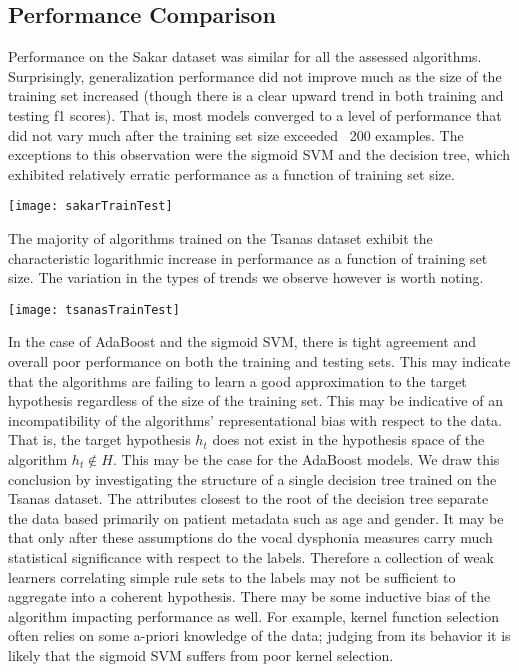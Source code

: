 \documentclass[12pt]{article}
\begin{document}
\begin{figure}%
    \centering
    \qquad
    \label{fig:svm}%
\end{figure}

\subsection{Performance Comparison}
Performance on the Sakar dataset was similar for all the assessed algorithms. Surprisingly, generalization performance did not improve much as the size of the training set increased (though there is a clear upward trend in both training and testing f1 scores). That is, most models converged to a level of performance that did not vary much after the training set size exceeded ~200 examples. The exceptions to this observation were the sigmoid SVM and the decision tree, which exhibited relatively erratic performance as a function of training set size.
\begin{center}
\texttt{[image: sakarTrainTest]}
\end{center}
The majority of algorithms trained on the Tsanas dataset exhibit the characteristic logarithmic increase in performance as a function of training set size. The variation in the types of trends we observe however is worth noting.
\begin{center}
\texttt{[image: tsanasTrainTest]}
\end{center}
In the case of AdaBoost and the sigmoid SVM, there is tight agreement and overall poor performance on both the training and testing sets. This may indicate that the algorithms are failing to learn a good approximation to the target hypothesis regardless of the size of the training set. This may be indicative of an incompatibility of the algorithms' representational bias with respect to the data. That is, the target hypothesis $h_t$ does not exist in the hypothesis space of the algorithm $h_t \notin H$. This may be the case for the AdaBoost models. We draw this conclusion by investigating the structure of a single decision tree trained on the Tsanas dataset. The attributes closest to the root of the decision tree separate the data based primarily on patient metadata such as age and gender. It may be that only after these assumptions do the vocal dysphonia measures carry much statistical significance with respect to the labels. Therefore a collection of weak learners correlating simple rule sets to the labels may not be sufficient to aggregate into a coherent hypothesis.  There may be some inductive bias of the algorithm impacting performance as well. For example, kernel function selection often relies on some a-priori knowledge of the data; judging from its behavior it is likely that the sigmoid SVM suffers from poor kernel selection.
\end{document}
